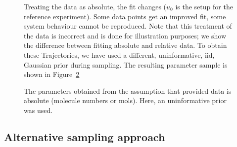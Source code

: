 \documentclass[english]{scrartcl}
\begin{document}
\begin{figure}
  \centering
  \hspace*{-3cm}
  \sffamily\tiny
  \caption{Treating the data as absolute, the fit changes ($u_0$ is
    the setup for the reference experiment). Some data points get an
    improved fit, some system behaviour cannot be reproduced. Note
    that this treatment of the data is incorrect and is done for
    illustration purposes; we show the difference between fitting
    absolute and relative data. To obtain these Trajectories, we have
    used a different, uninformative, iid, Gaussian prior during
    sampling. The resulting parameter sample is shown in
    Figure~\ref{fig:AbsoluteSample}}
  \label{fig:AbsoluteFit}
\end{figure}

\begin{figure}
  \centering 
  
  \caption{The parameters obtained from the assumption that provided
    data is absolute (molecule numbers or mols). Here, an
    uninformative prior was used.}
  \label{fig:AbsoluteSample}
\end{figure}

\subsection{Alternative sampling approach}
\end{document}
